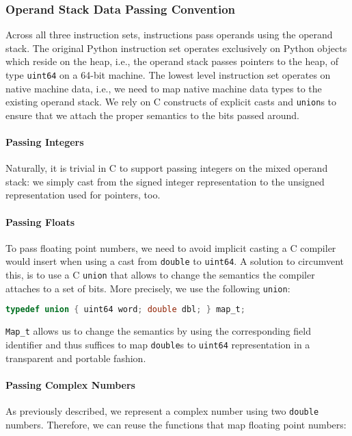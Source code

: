 \documentclass[preprint,10pt]{popl14conf}
\begin{document}
\subsubsection{Operand Stack Data Passing Convention}

Across all three instruction sets, instructions pass operands using the operand stack.
The original Python instruction set operates exclusively on Python objects which reside on the heap,
i.e., the operand stack passes pointers to the heap, of type \texttt{uint64} on a 64-bit machine.
The lowest level instruction set operates on native machine data, i.e., we need to map native
machine data types to the existing operand stack.
We rely on C constructs of explicit casts and \texttt{union}s to ensure that we attach the proper
semantics to the bits passed around.

\paragraph{Passing Integers}
Naturally, it is trivial in C to support passing integers on the mixed operand stack: we simply cast
from the signed integer representation to the unsigned representation used for pointers, too.


\paragraph{Passing Floats}
To pass floating point numbers, we need to avoid implicit casting a C compiler would insert when
using a cast from \texttt{double} to \texttt{uint64}.
A solution to circumvent this, is to use a C \texttt{union} that allows to change the semantics the
compiler attaches to a set of bits.
More precisely, we use the following \texttt{union}:
\begin{lstlisting}[language=C, morekeywords={uint64,int64},style=othercode]
typedef union { uint64 word; double dbl; } map_t;
\end{lstlisting}
\texttt{Map_t} allows us to change the semantics by using the corresponding field identifier and
thus suffices to map \texttt{double}s to \texttt{uint64} representation in a transparent and
portable fashion.



\paragraph{Passing Complex Numbers}
As previously described, we represent a complex number using two \texttt{double} numbers.
Therefore, we can reuse the functions that map floating point numbers:
\end{document}
